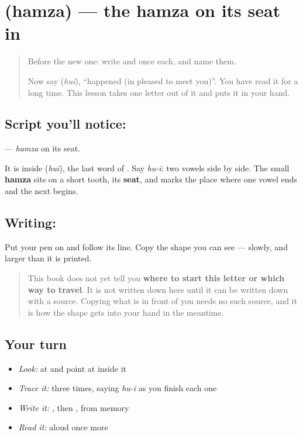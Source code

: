 \section[\texorpdfstring{\ur{ئ} (hamza)}{ئ (hamza)}]{ (hamza) — the hamza on its seat in }

\label{lesson:UR-W37-hamza-seat}



\begin{quote}
Before the new one: write  and  once each, and name them.

Now say \textbf{} (\emph{huī}), \textquotedblleft{}happened (in pleased to meet you)\textquotedblright{}. You have read it for a long time. This lesson takes one letter out of it and puts it in your hand.
\end{quote}

\subsection*{Script you'll notice: }
\textbf{} — \emph{hamza} on its seat.

It is inside \textbf{} (\emph{huī}), the last word of \textbf{     }. Say \emph{hu-ī}: two vowels side by side. The small \textbf{hamza} sits on a short tooth, its \textbf{seat}, and marks the place where one vowel ends and the next begins.

\subsection*{Writing: }
Put your pen on  and follow its line. Copy the shape you can see — slowly, and larger than it is printed.

\begin{quote}
This book does not yet tell you \textbf{where to start this letter or which way to travel}. It is not written down here until it can be written down with a source. Copying what is in front of you needs no such source, and it is how the shape gets into your hand in the meantime.
\end{quote}

\subsection*{Your turn}
\begin{itemize}
\raggedright
  \item \emph{Look:} at \textbf{} and point at  inside it
  \item \emph{Trace it:}  three times, saying \emph{hu-ī} as you finish each one
  \item \emph{Write it:} , then , from memory
  \item \emph{Read it:} \textbf{} aloud once more
\end{itemize}

